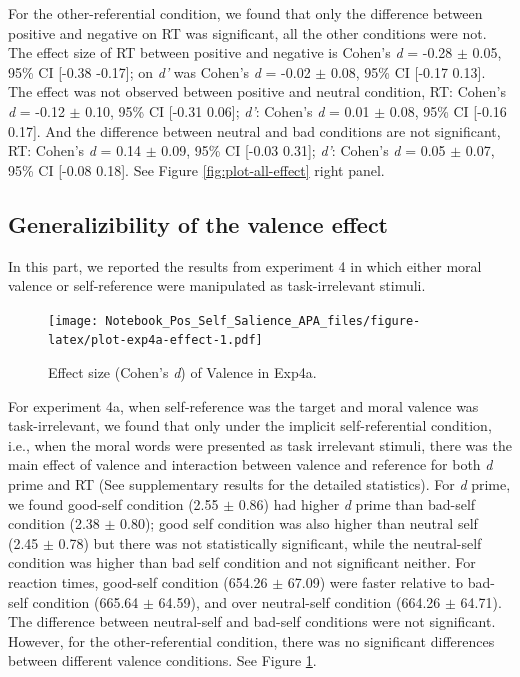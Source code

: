 \documentclass[
  english,
  man]{apa6}
\begin{document}
For the other-referential condition, we found that only the difference between positive and negative on RT was significant, all the other conditions were not. The effect size of RT between positive and negative is Cohen's \emph{d} = -0.28 \(\pm\) 0.05, 95\% CI {[}-0.38 -0.17{]}; on \emph{d'} was Cohen's \emph{d} = -0.02 \(\pm\) 0.08, 95\% CI {[}-0.17 0.13{]}. The effect was not observed between positive and neutral condition, RT: Cohen's \emph{d} = -0.12 \(\pm\) 0.10, 95\% CI {[}-0.31 0.06{]}; \emph{d'}: Cohen's \emph{d} = 0.01 \(\pm\) 0.08, 95\% CI {[}-0.16 0.17{]}. And the difference between neutral and bad conditions are not significant, RT: Cohen's \emph{d} = 0.14 \(\pm\) 0.09, 95\% CI {[}-0.03 0.31{]}; \emph{d'}: Cohen's \emph{d} = 0.05 \(\pm\) 0.07, 95\% CI {[}-0.08 0.18{]}. See Figure \ref{fig:plot-all-effect} right panel.

\hypertarget{generalizibility-of-the-valence-effect}{%
\subsection{Generalizibility of the valence effect}\label{generalizibility-of-the-valence-effect}}

In this part, we reported the results from experiment 4 in which either moral valence or self-reference were manipulated as task-irrelevant stimuli.

\begin{figure}
\centering
\texttt{[image: Notebook\_Pos\_Self\_Salience\_APA\_files/figure-latex/plot-exp4a-effect-1.pdf]}
\caption{\label{fig:plot-exp4a-effect}Effect size (Cohen's \emph{d}) of Valence in Exp4a.}
\end{figure}

For experiment 4a, when self-reference was the target and moral valence was task-irrelevant, we found that only under the implicit self-referential condition, i.e., when the moral words were presented as task irrelevant stimuli, there was the main effect of valence and interaction between valence and reference for both \emph{d} prime and RT (See supplementary results for the detailed statistics). For \emph{d} prime, we found good-self condition (2.55 \(\pm\) 0.86) had higher \emph{d} prime than bad-self condition (2.38 \(\pm\) 0.80); good self condition was also higher than neutral self (2.45 \(\pm\) 0.78) but there was not statistically significant, while the neutral-self condition was higher than bad self condition and not significant neither. For reaction times, good-self condition (654.26 \(\pm\) 67.09) were faster relative to bad-self condition (665.64 \(\pm\) 64.59), and over neutral-self condition (664.26 \(\pm\) 64.71). The difference between neutral-self and bad-self conditions were not significant. However, for the other-referential condition, there was no significant differences between different valence conditions. See Figure \ref{fig:plot-exp4a-effect}.
\end{document}
